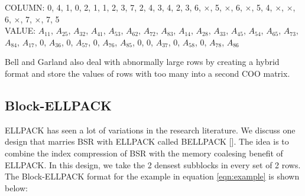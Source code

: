 COLUMN: 0, 4, 1, 0, 2, 1, 1, 2, 3, 7, 2, 4, 3, 4, 2, 3, 6, $\times$, 5, $\times$, 6, $\times$, 5, 4, $\times$, $\times$, 6, $\times$, 7, $\times$, 7, 5\\
VALUE: $A_{11}$, $A_{25}$, $A_{32}$, $A_{41}$, $A_{53}$, $A_{62}$, $A_{72}$, $A_{83}$, $A_{14}$, $A_{28}$, $A_{33}$, $A_{45}$, $A_{54}$, $A_{65}$, $A_{73}$, $A_{84}$, $A_{17}$, $0$, $A_{36}$, $0$, $A_{57}$, $0$, $A_{76}$, $A_{85}$, $0$, $0$, $A_{37}$, $0$, $A_{58}$, $0$, $A_{78}$, $A_{86}$ \par
Bell and Garland also deal with abnormally large rows by creating a hybrid format and store the values of rows with too many into a second COO matrix.
\subsection{Block-ELLPACK}
\label{sec:bellpack}
ELLPACK has seen a lot of variations in the research literature. We discuss one design that marries BSR with ELLPACK called BELLPACK [\cite{prelim:choi}]. The idea is to combine the index compression of BSR with the memory coalesing benefit of ELLPACK. In this design, we take the 2 densest subblocks in every set of 2 rows. The Block-ELLPACK format for the example in equation \ref{eqn:example} is shown below:\\
